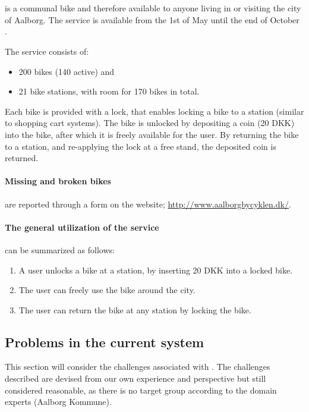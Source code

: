 \section{\citybike}\label{aalborg_bycyklen}
\citybike is a communal bike and therefore available to anyone living in or visiting the city of Aalborg.
The service is available from the 1st of May until the end of October \cite{aalborgbycyklenbagcyklen}.

\noindent The service consists of:
\begin{itemize}
\item 200 bikes (140 active) and 
\item 21 bike stations, with room for 170 bikes in total.
\end{itemize}
Each bike is provided with a lock, that enables locking a bike to a station (similar to shopping cart systems).
The bike is unlocked by depositing a coin (20 DKK) into the bike, after which it is freely available for the user.
By returning the bike to a station, and re-applying the lock at a free stand, the deposited coin is returned.

\paragraph{Missing and broken bikes} are reported through a form on the \citybike website; \url{http://www.aalborgbycyklen.dk/}.

\paragraph{The general utilization of the service} can be summarized as follows:
\begin{enumerate}
\item A user unlocks a bike at a station, by inserting 20 DKK into a locked bike.
\item The user can freely use the bike around the city.
\item The user can return the bike at any station by locking the bike.
\end{enumerate}

\subsection{Problems in the current system} \label{aalborg_bycyklen:challenges}
This section will consider the challenges associated with \citybike.
The challenges described are devised from our own experience and perspective but still considered reasonable, as there is no target group according to the domain experts (Aalborg Kommune).

